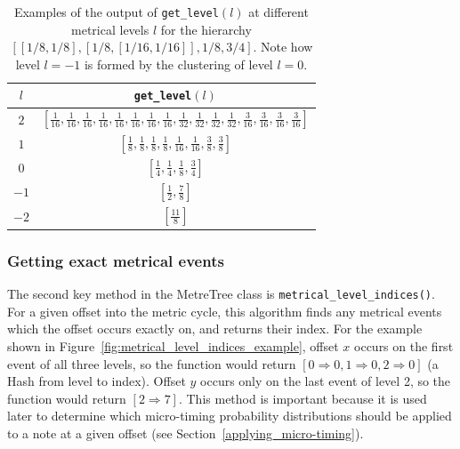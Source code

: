 \documentclass[12pt,twoside,openright]{report}
\begin{document}
\begin{table}[ht]
    \centering
    \renewcommand{\arraystretch}{2.0}
    \begin{tabular}{|c|c|}
        \hline
        $l$     & \verb'get_level'$(l)$ \\
        \hline
        $2$     & $\displaystyle \left[ \frac{1}{16},\frac{1}{16},\frac{1}{16},\frac{1}{16},\frac{1}{16},\frac{1}{16},\frac{1}{16},\frac{1}{16},\frac{1}{32},\frac{1}{32},\frac{1}{32},\frac{1}{32},\frac{3}{16},\frac{3}{16},\frac{3}{16},\frac{3}{16} \right]$ \\
        $1$     & $\displaystyle \left[ \frac{1}{8},\frac{1}{8},\frac{1}{8},\frac{1}{8},\frac{1}{16},\frac{1}{16},\frac{3}{8},\frac{3}{8} \right]$ \\
        $0$     & $\displaystyle \left[ \frac{1}{4},\frac{1}{4},\frac{1}{8},\frac{3}{4} \right]$ \\
        $-1$    & $\displaystyle \left[ \frac{1}{2},\frac{7}{8} \right]$ \\
        $-2$    & $\displaystyle \left[ \frac{11}{8} \right]$ \\ [1ex]
        \hline
    \end{tabular}
    \renewcommand{\arraystretch}{1.0}
    \cprotect\caption{Examples of the output of \verb'get_level'$(l)$ at different metrical levels $l$ for the hierarchy $[[1/8,1/8],[1/8,[1/16,1/16]],1/8,3/4]$. Note how level $l=-1$ is formed by the clustering of level $l=0$.}
    \label{table:get_level}
\end{table}

\subsubsection{Getting exact metrical events} \label{metrical_level_indices}

The second key method in the MetreTree class is \verb'metrical_level_indices()'. For a
given offset into the metric cycle, this algorithm finds any metrical events
which the offset occurs exactly on, and returns their index. For the example shown in Figure~\ref{fig:metrical_level_indices_example}, offset $x$
occurs on the first event of all three levels, so the function would return $[0 \Rightarrow 0,1 \Rightarrow 0,2 \Rightarrow 0]$ (a Hash from level to index). Offset $y$ occurs only on the last event of
level 2, so the function would return $[2 \Rightarrow 7]$. This method is important because it
is used later to determine which micro-timing probability distributions should
be applied to a note at a given offset (see Section~\ref{applying_micro-timing}).
\end{document}
